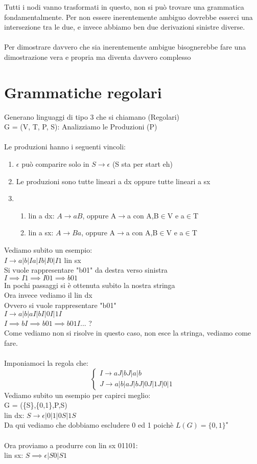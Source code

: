 \documentclass[12pt, a4paper, openany, oneside]{book}
\begin{document}
Tutti i nodi vanno trasformati in questo, non si può trovare una grammatica 
fondamentalmente. Per non essere inerentemente ambiguo dovrebbe esserci una 
intersezione tra le due, e invece abbiamo ben due derivazioni sinistre diverse.
\\ \\
Per dimostrare davvero che sia inerentemente ambigue bisognerebbe fare una 
dimostrazione vera e propria ma diventa davvero complesso
\section{Grammatiche regolari}
Generano linguaggi di tipo 3 che si chiamano (Regolari) \\
G = (V, T, P, S): Analizziamo le Produzioni (P)\\ \\
Le produzioni hanno i seguenti vincoli:
\begin{enumerate}
	\item $\epsilon$ può comparire solo in $S \to \epsilon$ (S sta per start eh)
	\item Le produzioni sono tutte lineari a dx oppure tutte lineari a sx
	\item \begin{enumerate}
	\item lin a dx: $A \to aB$, oppure A$\to$a con A,B$\in$V e a$\in$T
	\item lin a sx: $A \to Ba$, oppure A$\to$a con A,B$\in$V e a$\in$T
\end{enumerate}
\end{enumerate}
Vediamo subito un esempio:\\
$I \to a|b|Ia|Ib|I0|I1$ lin sx\\
Si vuole rappresentare "b01" da destra verso sinistra\\
$I \implies I1 \implies I01 \implies b01$ \\
In pochi passaggi si è ottenuta subito la nostra stringa \\
Ora invece vediamo il lin dx\\
Ovvero si vuole rappresentare "b01" \\
$I \to a|b|aI|bI|0I|1I$ \\
$I \implies bI \implies b01 \implies b01I ... $ ? \\
Come vediamo non si risolve in questo caso, non esce la stringa, vediamo come fare.
\\ \\
Imponiamoci la regola che:
\[\begin{cases}
I \to aJ|bJ|a|b \\
J \to a|b|aJ|bJ|0J|1J|0|1
\end{cases}\]
Vediamo subito un esempio per capirci meglio: \\
G = (\{S\},\{0,1\},P,S) \\
lin dx: $S \to \epsilon|0|1|0S|1S$ \\
Da qui vediamo che dobbiamo escludere 0 ed 1 poichè
$L(G) = \{0,1\}^{\star}$\\ \\
Ora proviamo a produrre con lin sx 01101: \\
lin sx: $S \implies \epsilon | S0 | S1$
\end{document}
